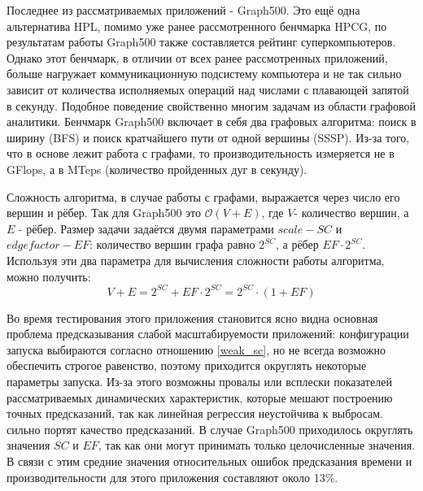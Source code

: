 		Последнее из рассматриваемых приложений - Graph500. Это ещё одна альтернатива HPL, помимо уже ранее рассмотренного бенчмарка HPCG, по результатам работы Graph500 также составляется рейтинг суперкомпьютеров. Однако этот бенчмарк, в отличии от всех ранее рассмотренных приложений, больше нагружает коммуникационную подсистему компьютера и не так сильно зависит от количества исполняемых операций над числами с плавающей запятой в секунду. Подобное поведение свойственно многим задачам из области графовой аналитики. Бенчмарк Graph500 включает в себя два графовых алгоритма: поиск в ширину (BFS) и поиск кратчайшего пути от одной вершины (SSSP). Из-за того, что в основе лежит работа с графами, то производительность измеряется не в GFlops, а в MTeps (количество пройденных дуг в секунду).

		Сложность алгоритма, в случае работы с графами, выражается через число его вершин и рёбер. Так для Graph500 это \(\mathcal{O}(V + E)\), где \(V\)- количество вершин, а \(E\) - рёбер. Размер задачи задаётся двумя параметрами \(scale - SC\) и \(edgefactor - EF\): количество вершин графа равно \(2^{SC}\), а рёбер \(EF \cdot 2^{SC}\). Используя эти два параметра для вычисления сложности работы алгоритма, можно получить: \[V + E = 2^{SC} + EF \cdot 2^{SC} = 2^{SC} \cdot (1 + EF) \]

		Во время тестирования этого приложения становится ясно видна основная проблема предсказывания слабой масштабируемости приложений: конфигурации запуска выбираются согласно отношению \eqref{weak_sc}, но не всегда возможно обеспечить строгое равенство, поэтому приходится округлять некоторые параметры запуска. Из-за этого возможны провалы или всплески показателей рассматриваемых динамических характеристик, которые мешают построению точных предсказаний, так как линейная регрессия неустойчива к выбросам. сильно портят качество предсказаний. В случае Graph500 приходилось округлять значения \(SC\) и \(EF\), так как они могут принимать только целочисленные значения. В связи с этим средние значения относительных ошибок предсказания времени и производительности для этого приложения составляют около 13\%.

\clearpage
